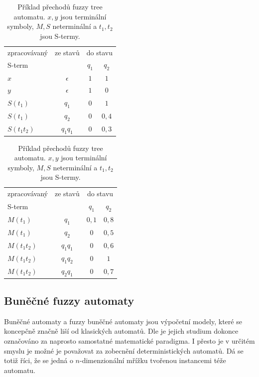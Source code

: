 \documentclass[a4paper,10pt]{article}
\begin{document}
\begin{table}
  \begin{tabular}{|l|c||c|c|}
    \hline 
    zpracovávaný	& ze stavů	& \multicolumn{2}{|c|}{do stavu}	\\
    S-term		& 		& $q_1$		& $q_2$		\\
    \hline \hline
    $x$			& $\epsilon$	& $1$		& $1$		\\
    \hline \hline
    $y$			& $\epsilon$	& $1$		& $0$		\\
    \hline \hline
    $S(t_1)$		& $q_1$		& $0$		& $1$		\\
    $S(t_1)$		& $q_2$		& $0$		& $0{,}4$	\\
    $S(t_1 t_2)$	& $q_1 q_1$	& $0$		& $0{,}3$	\\  
    \hline
  \end{tabular} \hfill
  \begin{tabular}{|l|c||c|c|}
    \hline 
    zpracovávaný	& ze stavů	& \multicolumn{2}{|c|}{do stavu}	\\
    S-term		& 		& $q_1$		& $q_2$		\\
    \hline \hline
    $M(t_1)$		& $q_1$		& $0{,}1$	& $0{,}8$	\\
    $M(t_1)$		& $q_2$		& $0$		& $0{,}5$	\\
    $M(t_1 t_2)$	& $q_1 q_1$	& $0$		& $0{,}6$	\\
    $M(t_1 t_2)$	& $q_1 q_2$	& $0$		& $1$		\\
    $M(t_1 t_2)$	& $q_2 q_1$	& $0$		& $0{,}7$	\\ 
    \hline
  \end{tabular}
  
  \caption[Příklad přechodů fuzzy tree automatu]{Příklad přechodů fuzzy tree automatu. $x, y$ jsou terminální symboly, $M, S$ neterminální a $t_1, t_2$ jsou S-termy.} \label{tab:FuzTreAutTrans}
\end{table}

\subsection{Buněčné fuzzy automaty}
Buněčné automaty a fuzzy buněčné automaty jsou výpočetní modely, které se koncepčně značně liší od klasických automatů. Dle \cite{Wol-NewKinSci} je jejich studium dokonce označováno za naprosto samostatné matematické paradigma. I přesto je v určitém smyslu je možné je považovat za zobecnění  deterministických automatů. Dá se totiž říci, že se jedná o $n$-dimenzionální mřížku tvořenou instancemi téže automatu.
\end{document}
